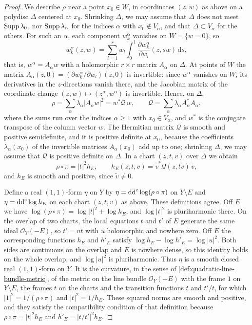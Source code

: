 \begin{proof}
We describe $\rho$ near a point $x_0\in W$, in coordinates $(z,w)$ as above on a polydisc $\Delta$ centered at $x_0$. Shrinking $\Delta$, we may assume that $\Delta$ does not meet $\operatorname{Supp}\lambda_0$, nor $\operatorname{Supp}\lambda_\alpha$ for the indices $\alpha$ with $x_0\notin V_\alpha$, and that $\Delta\subset V_\alpha$ for the others. For such an $\alpha$, each component $w^\alpha_k$ vanishes on $W=\{w=0\}$, so
\[
 w^\alpha_k(z,w)=\sum_{l=1}^rw_l\int_0^1\frac{\partial w^\alpha_k}{\partial w_l}(z,sw)\,\mathrm ds,
\]
that is, $w^\alpha=A_\alpha w$ with a holomorphic $r\times r$ matrix $A_\alpha$ on $\Delta$. At points of $W$ the matrix $A_\alpha(z,0)=(\partial w^\alpha_k/\partial w_l)(z,0)$ is invertible: since $w^\alpha$ vanishes on $W$, its derivatives in the $z$-directions vanish there, and the Jacobian matrix of the coordinate change $(z,w)\mapsto(z^\alpha,w^\alpha)$ is invertible. Hence, on $\Delta$,
\[
 \rho=\sum_\alpha\lambda_\alpha|A_\alpha w|^2=w^*\mathcal Q\,w,\qquad \mathcal Q=\sum_\alpha\lambda_\alpha A_\alpha^*A_\alpha,
\]
where the sums run over the indices $\alpha\geq1$ with $x_0\in V_\alpha$, and $w^*$ is the conjugate transpose of the column vector $w$. The Hermitian matrix $\mathcal Q$ is smooth and positive semidefinite, and it is positive definite at $x_0$, because the coefficients $\lambda_\alpha(x_0)$ of the invertible matrices $A_\alpha(x_0)$ add up to one; shrinking $\Delta$, we may assume that $\mathcal Q$ is positive definite on $\Delta$. In a chart $(z,t,v)$ over $\Delta$ we obtain
\[
 \rho\circ\pi=|t|^2h_E,\qquad h_E(z,t,v)=\tilde v^*\mathcal Q(z,t\tilde v)\,\tilde v,
\]
and $h_E$ is smooth and positive, since $\tilde v\neq0$.

Define a real $(1,1)$-form $\eta$ on $Y$ by $\eta=\mathrm{dd}^{\mathrm{c}}\log(\rho\circ\pi)$ on $Y\setminus E$ and $\eta=\mathrm{dd}^{\mathrm{c}}\log h_E$ on each chart $(z,t,v)$ as above. These definitions agree. Off $E$ we have $\log(\rho\circ\pi)=\log|t|^2+\log h_E$, and $\log|t|^2$ is pluriharmonic there. On the overlap of two charts, the local equations $t$ and $t'$ of $E$ generate the same ideal $\mathcal O_Y(-E)$, so $t'=ut$ with $u$ holomorphic and nowhere zero. Off $E$ the corresponding functions $h_E$ and $h'_E$ satisfy $\log h_E-\log h'_E=\log|u|^2$. Both sides are continuous on the overlap and $E$ is nowhere dense, so this identity holds on the whole overlap, and $\log|u|^2$ is pluriharmonic. Thus $\eta$ is a smooth closed real $(1,1)$-form on $Y$. It is the curvature, in the sense of \cref{def:quadratic-line-bundle-metric}, of the metric on the line bundle $\mathcal O_Y(-E)$ with the frame $1$ on $Y\setminus E$, the frames $t$ on the charts and the transition functions $t$ and $t'/t$, for which $|1|^2=1/(\rho\circ\pi)$ and $|t|^2=1/h_E$. These squared norms are smooth and positive, and they satisfy the compatibility condition of that definition because $\rho\circ\pi=|t|^2h_E$ and $h'_E=|t/t'|^2h_E$.


\end{proof}
